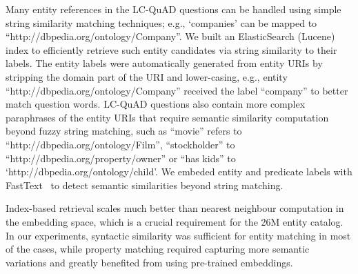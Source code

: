 Many entity references in the LC-QuAD questions can be handled using simple string similarity matching techniques; e.g., `companies' can be mapped to ``http://dbpedia.org/ontology/Comp\-any''.
We built an ElasticSearch (Lucene) index to efficiently retrieve such entity candidates via string similarity to their labels.
The entity labels were automatically generated from entity URIs by stripping the domain part of the URI and lower-casing, e.g., entity ``http://dbpedia.org/ontology/Company'' received the label ``company'' to better match question words.
LC-QuAD questions also contain more complex paraphrases of the entity URIs that require semantic similarity computation beyond fuzzy string matching, such as ``movie'' refers to ``http://dbpedia.org/ontology/Film'', ``stockholder'' to ``http://dbpedia.org/property/owner'' or ``has kids'' to `http://dbpedia.org/ontology/child'.
We embeded entity and predicate labels with FastText~\cite{bojanowski2017enriching} to detect semantic similarities beyond string matching.

Index-based retrieval scales much better than nearest neighbour computation in the embedding space, which is a crucial requirement for the 26M entity catalog.
In our experiments, syntactic similarity was sufficient for entity matching in most of the cases, while property matching required capturing more semantic variations and greatly benefited from using pre-trained embeddings.
